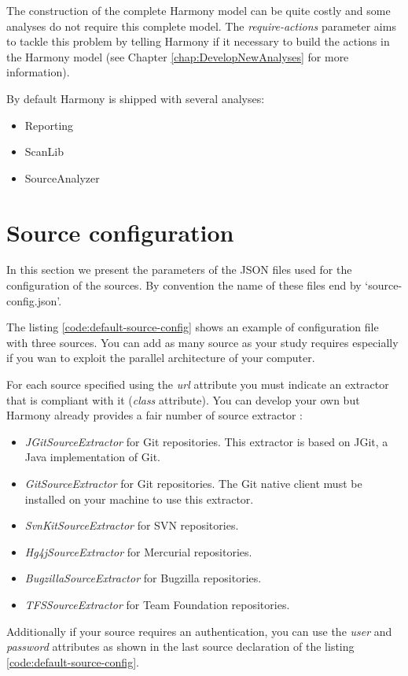 		
		The construction of the complete Harmony model can be quite costly and some analyses do not require this complete model. The \emph{require-actions} parameter aims to tackle this problem by telling Harmony if it necessary to build the actions in the Harmony model (see Chapter \ref{chap:DevelopNewAnalyses} for more information).
		
		By default Harmony is shipped with several analyses:
			\begin{itemize}
				\item Reporting
				\item ScanLib
				\item SourceAnalyzer
			\end{itemize}

	
	\section{Source configuration}\label{sec:advancedUse:sourceConfig}
In this section we present the parameters of the JSON files used for the configuration of the sources. By convention the name of these files end by `source-config.json'.

The listing \ref{code:default-source-config} shows an example of configuration file with three sources. You can add as many source as your study requires especially if you wan to exploit the parallel architecture of your computer. 


For each source specified using the \emph{url} attribute you must indicate an extractor that is compliant with it (\emph{class} attribute). You can develop your own but Harmony already provides a fair number of source extractor :
		\begin{itemize}
			\item \emph{JGitSourceExtractor} for Git repositories. This extractor is based on JGit, a Java implementation of Git.
			\item \emph{GitSourceExtractor} for Git repositories. The Git native client must be installed on your machine to use this extractor.
			\item \emph{SvnKitSourceExtractor} for SVN repositories.
			\item \emph{Hg4jSourceExtractor} for Mercurial repositories.
			\item \emph{BugzillaSourceExtractor} for Bugzilla repositories.
			\item \emph{TFSSourceExtractor} for Team Foundation repositories.
		\end{itemize}
		
Additionally if your source requires an authentication, you can use the \emph{user} and \emph{password} attributes as shown in the last source declaration of the listing \ref{code:default-source-config}.


	
	